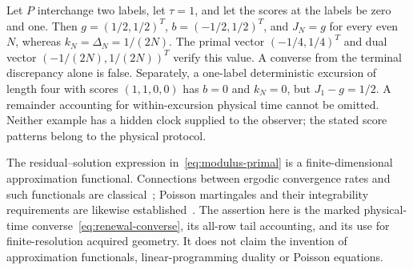 \begin{remark}\label{rem:prefix-tail}
Let $P$ interchange two labels, let $\tau=1$, and let the scores at the labels be zero and one. Then $g=(1/2,1/2)^T$, $b=(-1/2,1/2)^T$, and $J_N=g$ for every even $N$, whereas $k_N=\Delta_N=1/(2N)$. The primal vector $(-1/4,1/4)^T$ and dual vector $(-1/(2N),1/(2N))^T$ verify this value. A converse from the terminal discrepancy alone is false. Separately, a one-label deterministic excursion of length four with scores $(1,1,0,0)$ has $b=0$ and $k_N=0$, but $J_1-g=1/2$. A remainder accounting for within-excursion physical time cannot be omitted. Neither example has a hidden clock supplied to the observer; the stated score patterns belong to the physical protocol.
\end{remark}

The residual--solution expression in~\eqref{eq:modulus-primal} is a finite-dimensional approximation functional. Connections between ergodic convergence rates and such functionals are classical~\cite{Shaw}; Poisson martingales and their integrability requirements are likewise established~\cite{GlynnInfanger}. The assertion here is the marked physical-time converse~\eqref{eq:renewal-converse}, its all-row tail accounting, and its use for finite-resolution acquired geometry. It does not claim the invention of approximation functionals, linear-programming duality or Poisson equations.
